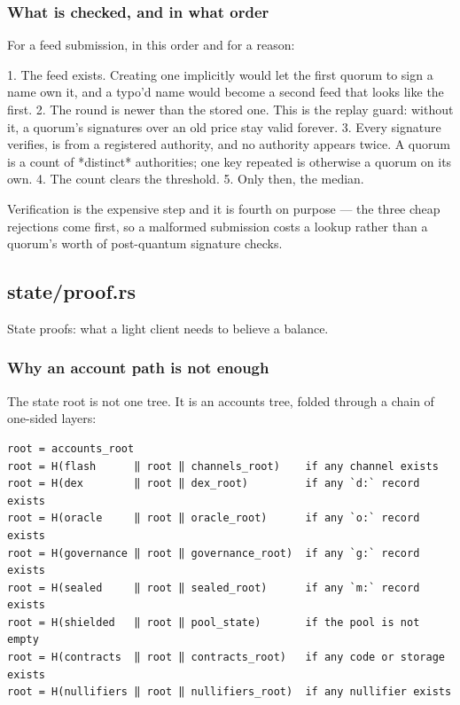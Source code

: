 \documentclass[11pt,a4paper]{article}
\begin{document}
\subsubsection{What is checked, and in what order}

For a feed submission, in this order and for a reason:

1. The feed exists. Creating one implicitly would let the first quorum to
   sign a name own it, and a typo'd name would become a second feed that
   looks like the first.
2. The round is newer than the stored one. This is the replay guard: without
   it, a quorum's signatures over an old price stay valid forever.
3. Every signature verifies, is from a registered authority, and no
   authority appears twice. A quorum is a count of *distinct* authorities;
   one key repeated is otherwise a quorum on its own.
4. The count clears the threshold.
5. Only then, the median.

Verification is the expensive step and it is fourth on purpose — the three
cheap rejections come first, so a malformed submission costs a lookup rather
than a quorum's worth of post-quantum signature checks.

\subsection{state/proof.rs}
State proofs: what a light client needs to believe a balance.

\subsubsection{Why an account path is not enough}

The state root is not one tree. It is an accounts tree, folded through a
chain of one-sided layers:

\begin{verbatim}
root = accounts_root
root = H(flash      ‖ root ‖ channels_root)    if any channel exists
root = H(dex        ‖ root ‖ dex_root)         if any `d:` record exists
root = H(oracle     ‖ root ‖ oracle_root)      if any `o:` record exists
root = H(governance ‖ root ‖ governance_root)  if any `g:` record exists
root = H(sealed     ‖ root ‖ sealed_root)      if any `m:` record exists
root = H(shielded   ‖ root ‖ pool_state)       if the pool is not empty
root = H(contracts  ‖ root ‖ contracts_root)   if any code or storage exists
root = H(nullifiers ‖ root ‖ nullifiers_root)  if any nullifier exists
\end{verbatim}
\end{document}
